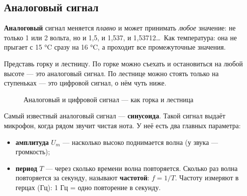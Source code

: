 \subsection{Аналоговый сигнал}

\textbf{Аналоговый} сигнал меняется \emph{плавно} и может принимать \emph{любое} значение: не только
1 или 2 вольта, но и 1,5, и 1,537, и 1,53712\ldots\ Как температура: она не прыгает с 15 °C сразу
на 16 °C, а проходит все промежуточные значения.

Представь горку и лестницу. По горке можно съехать и остановиться на любой высоте --- это аналоговый
сигнал. По лестнице можно стоять только на ступеньках --- это цифровой сигнал, о нём чуть ниже.

\begin{figure}[H]
\centering
{}
\caption{Аналоговый и цифровой сигнал --- как горка и лестница}
\end{figure}

Самый известный аналоговый сигнал --- \textbf{синусоида}. Такой сигнал выдаёт микрофон, когда
рядом звучит чистая нота. У неё есть два главных параметра:
\begin{itemize}
  \item \textbf{амплитуда} $U_m$ --- насколько высоко поднимается волна (у звука --- громкость);
  \item \textbf{период} $T$ --- через сколько времени волна повторяется. Сколько раз волна повторяется за
        секунду, называют \textbf{частотой}: $f = 1/T$. Частоту измеряют в герцах (Гц): 1 Гц = одно повторение в секунду.
\end{itemize}

